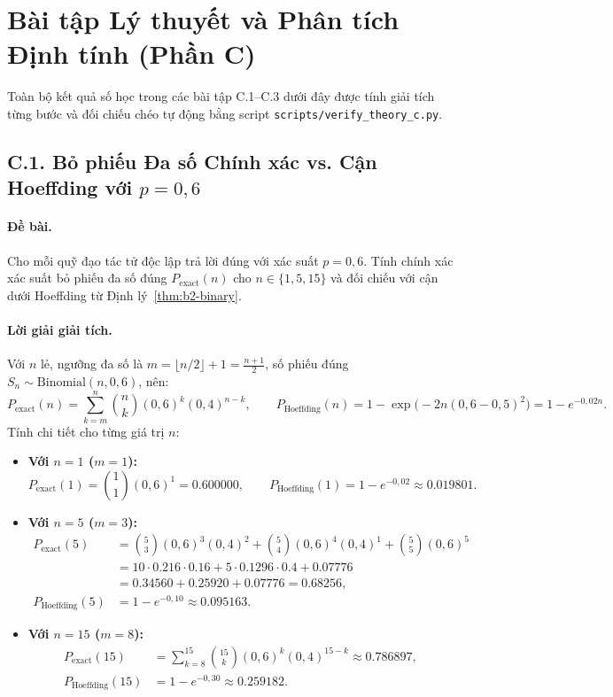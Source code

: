 \section{Bài tập Lý thuyết và Phân tích Định tính (Phần C)}
\label{sec:part-c}

Toàn bộ kết quả số học trong các bài tập C.1--C.3 dưới đây được tính giải tích từng bước và đối chiếu chéo tự động bằng script \texttt{scripts/verify\_theory\_c.py}.

\subsection{C.1. Bỏ phiếu Đa số Chính xác vs. Cận Hoeffding với $p = 0{,}6$}
\label{subsec:c1}

\paragraph{Đề bài.}
Cho mỗi quỹ đạo tác tử độc lập trả lời đúng với xác suất $p = 0{,}6$. Tính chính xác xác suất bỏ phiếu đa số đúng $P_{\text{exact}}(n)$ cho $n \in \{1, 5, 15\}$ và đối chiếu với cận dưới Hoeffding từ Định lý~\ref{thm:b2-binary}.

\paragraph{Lời giải giải tích.}
Với $n$ lẻ, ngưỡng đa số là $m = \lfloor n/2 \rfloor + 1 = \frac{n + 1}{2}$, số phiếu đúng $S_n \sim \text{Binomial}(n, 0{,}6)$, nên:
\[
  P_{\text{exact}}(n) = \sum_{k=m}^{n} \binom{n}{k} (0{,}6)^k (0{,}4)^{n-k}, \qquad
  P_{\text{Hoeffding}}(n) = 1 - \exp\!\bigl(-2n(0{,}6 - 0{,}5)^2\bigr) = 1 - e^{-0{,}02 n}.
\]
Tính chi tiết cho từng giá trị $n$:
\begin{itemize}
  \item \textbf{Với $n = 1$ ($m = 1$):}
  \[
    P_{\text{exact}}(1) = \binom{1}{1}(0{,}6)^1 = 0.600000, \qquad
    P_{\text{Hoeffding}}(1) = 1 - e^{-0{,}02} \approx 0.019801.
  \]
  \item \textbf{Với $n = 5$ ($m = 3$):}
  \begin{align*}
    P_{\text{exact}}(5)
    &= \binom{5}{3}(0{,}6)^3(0{,}4)^2 + \binom{5}{4}(0{,}6)^4(0{,}4)^1 + \binom{5}{5}(0{,}6)^5 \\
    &= 10 \cdot 0.216 \cdot 0.16 + 5 \cdot 0.1296 \cdot 0.4 + 0.07776 \\
    &= 0.34560 + 0.25920 + 0.07776 = 0.68256, \\
    P_{\text{Hoeffding}}(5) &= 1 - e^{-0{,}10} \approx 0.095163.
  \end{align*}
  \item \textbf{Với $n = 15$ ($m = 8$):}
  \begin{align*}
    P_{\text{exact}}(15) &= \sum_{k=8}^{15} \binom{15}{k}(0{,}6)^k(0{,}4)^{15-k} \approx 0.786897, \\
    P_{\text{Hoeffding}}(15) &= 1 - e^{-0{,}30} \approx 0.259182.
  \end{align*}
\end{itemize}

